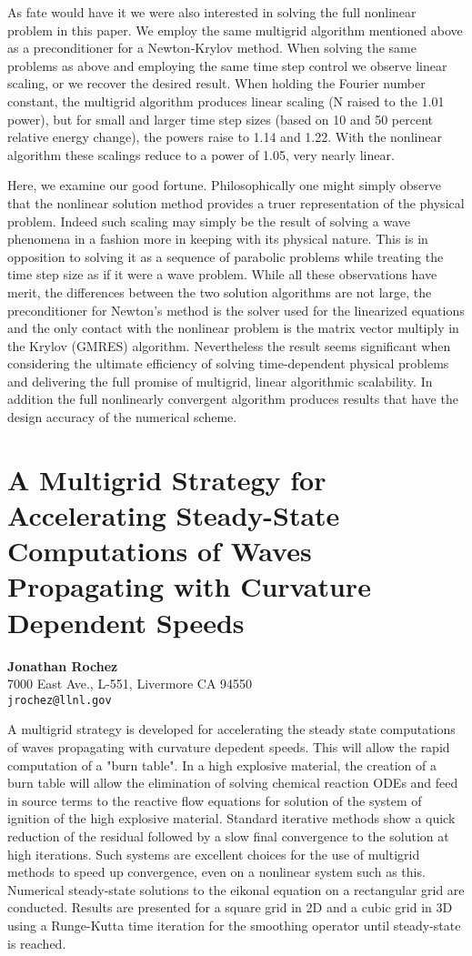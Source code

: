 \documentclass[11pt]{article}
\newcommand{\nextab}[4]{
	\section{#2}
	{\bf #1} \\ \nopagebreak
	{#3} \\ \nopagebreak
	{\tt #4} \nopagebreak
	}
\begin{document}
As fate would have it we were also interested in solving the full
nonlinear problem in this paper.  We employ the same multigrid
algorithm mentioned above as a preconditioner for a Newton-Krylov
method.  When solving the same problems as above and employing the
same time step control we observe linear scaling, or we recover
the desired result.
When holding the Fourier number constant, the multigrid algorithm
produces linear scaling (N raised to the 1.01 power), but for small
and larger time step sizes (based on 10 and 50 percent relative
energy change), the powers raise to 1.14 and 1.22.  With the nonlinear
algorithm these scalings reduce to a power of 1.05, very nearly linear.

Here, we examine our good fortune.  Philosophically one might simply
observe that the nonlinear solution method provides a truer
representation of the physical problem.  Indeed such scaling may simply
be the result of solving a wave phenomena in a fashion more in
keeping with its physical nature.  This is in opposition to solving it
as a sequence of parabolic problems while treating the time step size
as if it were a wave problem.  While all these observations have merit,
the differences between the two solution algorithms are not large, the
preconditioner for Newton's method is the solver used for the linearized
equations and the only contact with the nonlinear problem is the matrix
vector multiply in the Krylov (GMRES) algorithm.  Nevertheless the
result seems significant when considering the ultimate efficiency of
solving time-dependent physical problems and delivering the full
promise of multigrid, linear algorithmic scalability. In addition
the full nonlinearly convergent algorithm produces results that have
the design accuracy of the numerical scheme.



\nextab{Jonathan Rochez}
	{A Multigrid Strategy for Accelerating Steady-State
	Computations of Waves Propagating with Curvature Dependent Speeds}
	{7000 East Ave., L-551, Livermore CA 94550}
	{jrochez@llnl.gov}

A multigrid strategy is developed for accelerating
the steady state computations of waves propagating with curvature
depedent speeds.  This will allow the rapid computation of  a "burn
table".  In a high explosive material, the creation of a burn table
will allow the elimination of solving chemical reaction ODEs and feed
in source terms to the reactive flow equations for solution of the
system of ignition of the high explosive material.  Standard iterative
methods show a quick reduction of the residual followed by a slow final
convergence to the solution at high iterations.  Such systems are
excellent choices for the use of multigrid methods to speed up
convergence, even on a nonlinear system such as this.  Numerical
steady-state solutions to the eikonal equation on a rectangular grid
are conducted.  Results are presented for a square grid in 2D and a
cubic grid in 3D using a Runge-Kutta time iteration for the smoothing
operator until steady-state is reached.
\end{document}
